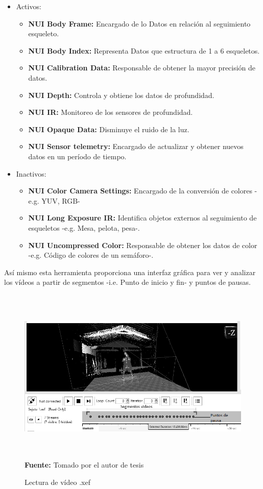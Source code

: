 \begin{itemize}
\item Activos:
\begin{itemize}
\item \textbf{NUI Body Frame:} Encargado de lo Datos en relaci\'on al seguimiento esqueleto.
\item \textbf{NUI Body Index:} Representa Datos que estructura de 1 a 6 esqueletos.
\item \textbf{NUI Calibration Data:} Responsable de obtener la mayor precisi\'on de datos.
\item \textbf{NUI Depth:} Controla y obtiene los datos de profundidad.
\item \textbf{NUI IR:} Monitoreo de los sensores de profundidad.
\item \textbf{NUI Opaque Data:} Disminuye el ruido de la luz.
\item \textbf{NUI Sensor telemetry:} Encargado de actualizar y obtener nuevos datos en un per\'iodo de tiempo.
\end{itemize}
\item Inactivos:
\begin{itemize}
\item \textbf{NUI Color Camera Settings:} Encargado de la conversi\'on de colores -e.g. YUV, RGB-
\item \textbf{NUI Long Exposure IR:} Identifica  objetos externos al seguimiento de esqueletos -e.g. Mesa, pelota, pesa-.
\item \textbf{NUI Uncompressed Color:} Responsable de obtener los datos de color -e.g. C\'odigo de colores de un sem\'aforo-.
\end{itemize}
\end{itemize}
As\'i mismo esta herramienta proporciona una interfaz gr\'afica para ver y analizar los v\'ideos a partir de segmentos -i.e. Punto de inicio y fin- y puntos de pausas.
\begin{figure}[H]
	\caption{Lectura de v\'ideo .xef }
	\label{fig:readVideoXEF}
	\centering
	\includegraphics[width=460px,height=320px]{graphics/readVideo.PNG} \\
	\textbf{Fuente:} Tomado por el autor de tesis
\end{figure} 

